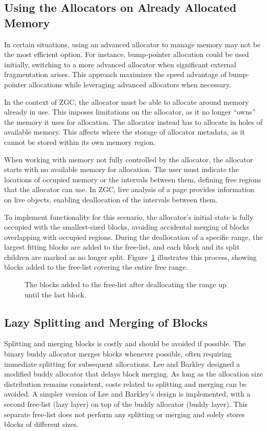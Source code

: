 \subsection{Using the Allocators on Already Allocated Memory} \label{sec:freerangeexpl}
In certain situations, using an advanced allocator to manage memory may not be the most efficient option. For instance, bump-pointer allocation could be used initially, switching to a more advanced allocator when significant external fragmentation arises. This approach maximizes the speed advantage of bump-pointer allocations while leveraging advanced allocators when necessary.

In the context of ZGC, the allocator must be able to allocate around memory already in use. This imposes limitations on the allocator, as it no longer ``owns'' the memory it uses for allocation. The allocator instead has to allocate in holes of available memory. This affects where the storage of allocator metadata, as it cannot be stored within its own memory region.

When working with memory not fully controlled by the allocator, the allocator starts with no available memory for allocation. The user must indicate the locations of occupied memory or the intervals between them, defining free regions that the allocator can use. In ZGC, live analysis of a page provides information on live objects, enabling deallocation of the intervals between them.

To implement functionality for this scenario, the allocator's initial state is fully occupied with the smallest-sized blocks, avoiding accidental merging of blocks overlapping with occupied regions. During the deallocation of a specific range, the largest fitting blocks are added to the free-list, and each block and its split children are marked as no longer split. Figure~\ref{fig:deallocrange} illustrates this process, showing blocks added to the free-list covering the entire free range.

\begin{figure}[h]
    \centering
    
    \caption{The blocks added to the free-list after deallocating the range up until the last block.}
    \label{fig:deallocrange}
\end{figure}

\subsection{Lazy Splitting and Merging of Blocks} \label{sec:lazyexpl}
Splitting and merging blocks is costly and should be avoided if possible. The binary buddy allocator merges blocks whenever possible, often requiring immediate splitting for subsequent allocations. Lee and Barkley \cite{lazylayer} designed a modified buddy allocator that delays block merging. As long as the allocation size distribution remains consistent, costs related to splitting and merging can be avoided. A simpler version of Lee and Barkley's design is implemented, with a second free-list (lazy layer) on top of the buddy allocator (buddy layer). This separate free-list does not perform any splitting or merging and solely stores blocks of different sizes.

